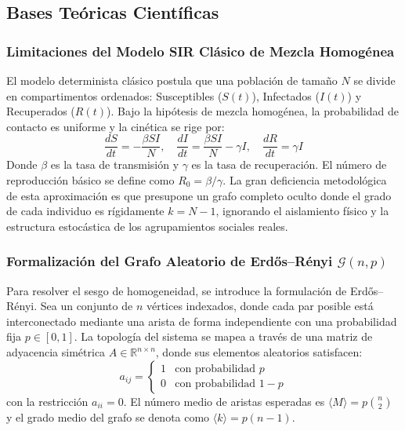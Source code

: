 \documentclass[12pt]{article}
\begin{document}
\subsection{Bases Teóricas Científicas}

\subsubsection{Limitaciones del Modelo SIR Clásico de Mezcla Homogénea}
El modelo determinista clásico postula que una población de tamaño $N$ se divide en compartimentos ordenados: Susceptibles ($S(t)$), Infectados ($I(t)$) y Recuperados ($R(t)$). Bajo la hipótesis de mezcla homogénea, la probabilidad de contacto es uniforme y la cinética se rige por:
\begin{equation}
    \frac{dS}{dt} = -\frac{\beta S I}{N}, \quad \frac{dI}{dt} = \frac{\beta S I}{N} - \gamma I, \quad \frac{dR}{dt} = \gamma I
\end{equation}
Donde $\beta$ es la tasa de transmisión y $\gamma$ es la tasa de recuperación. El número de reproducción básico se define como $R_0 = \beta / \gamma$. La gran deficiencia metodológica de esta aproximación es que presupone un grafo completo oculto donde el grado de cada individuo es rígidamente $k = N-1$, ignorando el aislamiento físico y la estructura estocástica de los agrupamientos sociales reales.

\subsubsection{Formalización del Grafo Aleatorio de Erdős–Rényi $\mathcal{G}(n,p)$}
Para resolver el sesgo de homogeneidad, se introduce la formulación de Erdős–Rényi. Sea un conjunto de $n$ vértices indexados, donde cada par posible está interconectado mediante una arista de forma independiente con una probabilidad fija $p \in [0,1]$. La topología del sistema se mapea a través de una matriz de adyacencia simétrica $A \in \mathbb{R}^{n \times n}$, donde sus elementos aleatorios satisfacen:
\begin{equation}
    a_{ij} = \begin{cases} 1 & \text{con probabilidad } p \\ 0 & \text{con probabilidad } 1-p \end{cases}
\end{equation}
con la restricción $a_{ii} = 0$. El número medio de aristas esperadas es $\langle M \rangle = p \binom{n}{2}$ y el grado medio del grafo se denota como $\langle k \rangle = p(n-1)$.
\end{document}
